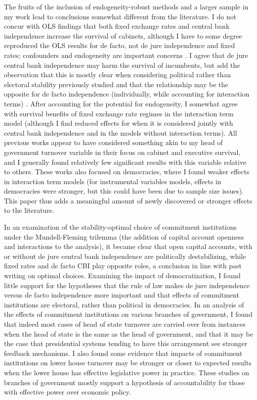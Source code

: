 \documentclass{article}
\begin{document}
    The fruits of the inclusion of endogeneity-robust methods and a larger sample in my work lead to conclusions somewhat different from the literature. I do not concur with OLS findings that both fixed exchange rates and central bank independence increase the survival of cabinets, although I have to some degree reproduced the OLS results for de facto, not de jure independence and fixed rates; confounders and endogeneity are important concerns \citep{bernhard_political_2002-1}. I agree that de jure central bank independence may harm the survival of incumbents, but add the observation that this is mostly clear when considering political rather than electoral stability previously studied and that the relationship may be the opposite for de facto independence (individually, while accounting for interaction terms) \citep{clark_monetary_2013}. After accounting for the potential for endogeneity, I somewhat agree with survival benefits of fixed exchange rate regimes in the interaction term model (although I find reduced effects for when it is considered jointly with central bank independence and in the models without interaction terms). All previous works appear to have considered something akin to my head of government turnover variable in their focus on cabinet and executive survival, and I generally found relatively few significant results with this variable relative to others. These works also focused on democracies, where I found weaker effects in interaction term models (for instrumental variables models, effects in democracies were stronger, but this could have been due to sample size issues). This paper thus adds a meaningful amount of newly discovered or stronger effects to the literature.

    In an examination of the stability-optimal choice of commitment institutions under the Mundell-Fleming trilemma (the addition of capital account openness and interactions to the analysis), it became clear that open capital accounts, with or without de jure central bank independence are politically destabilizing, while fixed rates and de facto CBI play opposite roles, a conclusion in line with past writing on optimal choices. Examining the impact of democratization, I found little support for the hypotheses that the rule of law makes de jure independence versus de facto independence more important and that effects of commitment institutions are electoral, rather than political in democracies. In an analysis of the effects of commitment institutions on various branches of government, I found that indeed most cases of head of state turnover are carried over from instances when the head of state is the same as the head of government, and that it may be the case that presidential systems tending to have this arrangement see stronger feedback mechanisms. I also found some evidence that impacts of commitment institutions on lower house turnover may be stronger or closer to expected results when the lower house has effective legislative power in practice. These studies on branches of government mostly support a hypothesis of accountability for those with effective power over economic policy.
\end{document}
